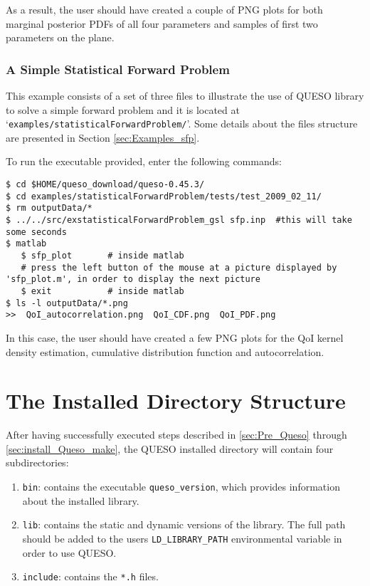 As a result, the user should have created a couple of PNG plots for both marginal posterior PDFs of all four parameters and samples of first two parameters on the plane.

\subsubsection{A Simple Statistical Forward Problem}

This example consists of a set of three files to illustrate the use of QUESO library to solve a simple forward problem and it is located at `\texttt{examples/statisticalForwardProblem/}'. Some details about the files structure are presented in Section \ref{sec:Examples_sfp}.

To run the executable provided, enter the following commands:
\begin{lstlisting}[label={},caption={}]
$ cd $HOME/queso_download/queso-0.45.3/
$ cd examples/statisticalForwardProblem/tests/test_2009_02_11/
$ rm outputData/*
$ ../../src/exstatisticalForwardProblem_gsl sfp.inp  #this will take some seconds
$ matlab
   $ sfp_plot       # inside matlab
   # press the left button of the mouse at a picture displayed by 'sfp_plot.m', in order to display the next picture
   $ exit           # inside matlab
$ ls -l outputData/*.png
>>  QoI_autocorrelation.png  QoI_CDF.png  QoI_PDF.png  
\end{lstlisting}


In this case, the user should have created a few PNG plots for the QoI kernel density estimation, cumulative distribution function and autocorrelation.


\section{The Installed Directory Structure} \label{sc-installed-dir-structure}

After having successfully executed steps described in \textsection{}\ref{sec:Pre_Queso} through \textsection{}\ref{sec:install_Queso_make}, the QUESO installed directory will contain four subdirectories:
\begin{enumerate}
 \item \verb+bin+: contains the executable \verb+queso_version+, which provides information about the installed library.
 \item \verb+lib+: contains the static and dynamic versions of the library. The full path should be added to the users \verb+LD_LIBRARY_PATH+ environmental variable in order to use QUESO.
 \item \verb+include+: contains the \verb+*.h+ files.
\end{enumerate}


